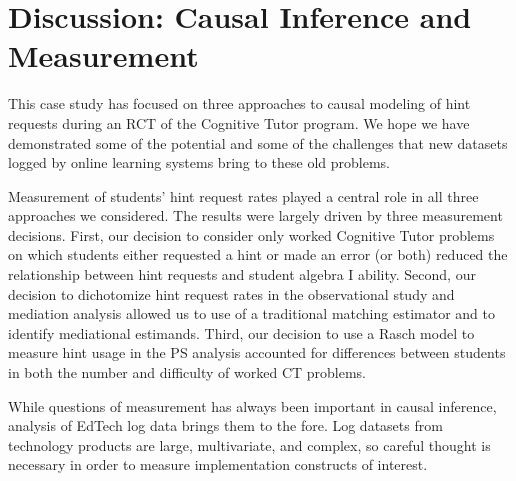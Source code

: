 \documentclass{article}\usepackage[]{graphicx}\usepackage[]{color}
\begin{document}


\section{Discussion: Causal Inference and Measurement}\label{sec:conclusion}
This case study has focused on three approaches to causal modeling of
hint requests during an RCT of the Cognitive Tutor program.
We hope we have demonstrated some of the potential and some of the
challenges that new datasets logged by online
learning systems bring to these old problems.

Measurement of students' hint request rates played a central role in all three approaches we considered.
The results were largely driven by three measurement decisions.
First, our decision to consider only worked Cognitive Tutor problems on which students either requested a hint or made an error (or both) reduced the relationship between hint requests and student algebra I ability.
Second, our decision to dichotomize hint request rates in the observational study and mediation analysis allowed us to use of a traditional matching estimator and to identify mediational estimands.
Third, our decision to use a Rasch model to measure hint usage in the PS analysis accounted for differences between students in both the number and difficulty of worked CT problems.

While questions of measurement has always been important in causal inference, analysis of EdTech log data brings them to the fore.
Log datasets from technology products are large, multivariate, and complex, so careful thought is necessary in order to measure implementation constructs of interest.
\end{document}
